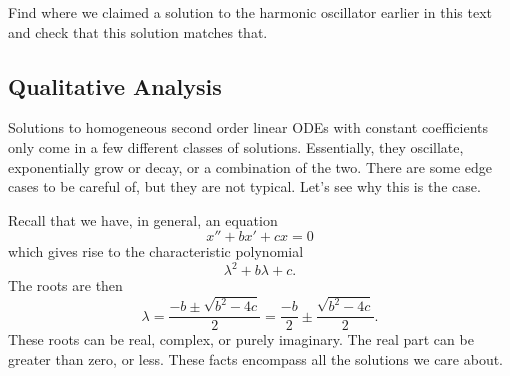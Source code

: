         \newpage

        \begin{exercise}
        Find where we claimed a solution to the harmonic oscillator earlier in this text and check that this solution matches that.
        \end{exercise}

        \subsection{Qualitative Analysis}

        Solutions to homogeneous second order linear ODEs with constant coefficients only come in a few different classes of solutions. Essentially, they oscillate, exponentially grow or decay, or a combination of the two.  There are some edge cases to be careful of, but they are not typical.  Let's see why this is the case.

        Recall that we have, in general, an equation
        \[
        x''+bx'+cx=0
        \]
        which gives rise to the characteristic polynomial
        \[
        \lambda^2+b\lambda + c.
        \]
        The roots are then
        \[
        \lambda = \frac{-b\pm \sqrt{b^2-4c}}{2}= \frac{-b}{2}\pm \frac{\sqrt{b^2-4c}}{2}.
        \]
        These roots can be real, complex, or purely imaginary. The real part can be greater than zero, or less.  These facts encompass all the solutions we care about.

